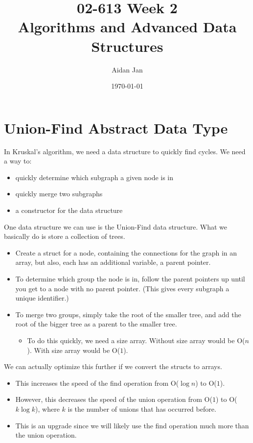 \documentclass[10pt]{article}
\title{02-613 Week 2 \\ \large{Algorithms and Advanced Data Structures}}
\author{Aidan Jan}
\date{\today}
\begin{document}
\maketitle

\section*{Union-Find Abstract Data Type}
In Kruskal's algorithm, we need a data structure to quickly find cycles.  We need a way to:
\begin{itemize}
    \item quickly determine which subgraph a given node is in
    \item quickly merge two subgraphs
    \item a constructor for the data structure
\end{itemize}
One data structure we can use is the Union-Find data structure.  What we basically do is store a collection of trees.
\begin{itemize}
    \item Create a struct for a node, containing the connections for the graph in an array, but also, each has an additional variable, a parent pointer.
    \item To determine which group the node is in, follow the parent pointers up until you get to a node with no parent pointer.  (This gives every subgraph a unique identifier.)
    \item To merge two groups, simply take the root of the smaller tree, and add the root of the bigger tree as a parent to the smaller tree.
    \begin{itemize}
        \item To do this quickly, we need a size array.  Without size array would be O($n$).  With size array would be O($1$).
    \end{itemize}
\end{itemize}
We can actually optimize this further if we convert the structs to arrays.
\begin{itemize}
    \item This increases the speed of the find operation from O($\log n$) to O($1$).
    \item However, this decreases the speed of the union operation from O($1$) to O($k \log k$), where $k$ is the number of unions that has occurred before.
    \item This is an upgrade since we will likely use the find operation much more than the union operation.
\end{itemize}
\end{document}
